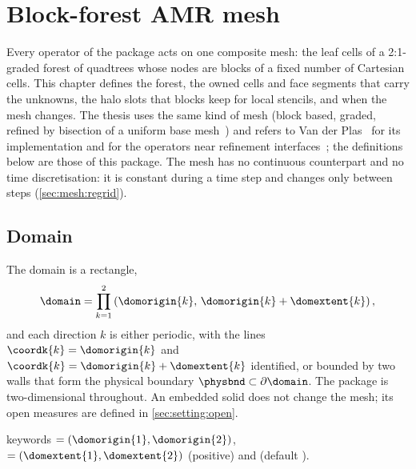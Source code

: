 \chapter{Block-forest AMR mesh}\label{ch:mesh-amr}
Every operator of the package acts on one composite mesh: the leaf cells of a
2:1-graded forest of quadtrees whose nodes are blocks of a fixed number of
Cartesian cells. This chapter defines the forest, the owned cells and face
segments that carry the unknowns, the halo slots that blocks keep for local
stencils, and when the mesh changes. The thesis uses the same kind of mesh
(block based, graded, refined by bisection of a uniform base
mesh~) and refers to Van der Plas~\cite{vanderplas2017} for its
implementation and for the operators near refinement
interfaces~; the definitions below are those of this package. The
mesh has no continuous counterpart and no time discretisation: it is constant
during a time step and changes only between steps (\cref{sec:mesh:regrid}).

\section{Domain}\label{sec:mesh:domain}
The domain is a rectangle,
\begin{equation}\label{eq:mesh:domain}
  \domain=\prod_{k=1}^{2}\roundpar{\domorigin{k},\,\domorigin{k}+\domextent{k}},
\end{equation}
and each direction $k$ is either periodic, with the lines
$\coordk{k}=\domorigin{k}$ and $\coordk{k}=\domorigin{k}+\domextent{k}$ identified, or
bounded by two walls that form the physical boundary
$\physbnd\subset\partial\domain$. The package is two-dimensional throughout.
An embedded solid does not change the mesh; its open measures are defined in
\cref{sec:setting:open}.
\begin{implnote}
 keywords  $=(\domorigin{1},\domorigin{2})$,
 $=(\domextent{1},\domextent{2})$ (positive) and 
(default ).
\end{implnote}

